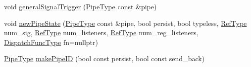 \begin{DoxyCompactItemize}
void \hyperlink{structvt_1_1pipe_1_1_pipe_manager_base_a27d24548529db938aeeb6fe11af985a1}{general\+Signal\+Trigger} (\hyperlink{namespacevt_ac9852acda74d1896f48f406cd72c7bd3}{Pipe\+Type} const \&pipe)
\item 
void \hyperlink{structvt_1_1pipe_1_1_pipe_manager_base_a458f8135ed2a44ec51afb21676c5db50}{new\+Pipe\+State} (\hyperlink{namespacevt_ac9852acda74d1896f48f406cd72c7bd3}{Pipe\+Type} const \&pipe, bool persist, bool typeless, \hyperlink{namespacevt_a9b39ce9494bb04674d0d5b895a5aa50f}{Ref\+Type} num\+\_\+sig, \hyperlink{namespacevt_a9b39ce9494bb04674d0d5b895a5aa50f}{Ref\+Type} num\+\_\+listeners, \hyperlink{namespacevt_a9b39ce9494bb04674d0d5b895a5aa50f}{Ref\+Type} num\+\_\+reg\+\_\+listeners, \hyperlink{structvt_1_1pipe_1_1_pipe_manager_base_a983e301505317c5ba2041461e7dec84a}{Dispatch\+Func\+Type} fn=nullptr)
\item 
\hyperlink{namespacevt_ac9852acda74d1896f48f406cd72c7bd3}{Pipe\+Type} \hyperlink{structvt_1_1pipe_1_1_pipe_manager_base_af1ba11407837cb69b4d205dd7ba880b0}{make\+Pipe\+ID} (bool const persist, bool const send\+\_\+back)
\end{DoxyCompactItemize}
